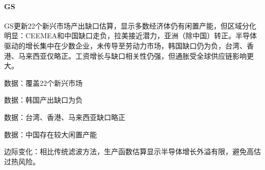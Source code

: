 \documentclass[11pt]{ctexart}
\begin{document}
\paragraph{GS} GS更新22个新兴市场产出缺口估算，显示多数经济体仍有闲置产能，但区域分化明显：CEEMEA和中国缺口走负，拉美接近潜力，亚洲（除中国）转正。半导体驱动的增长集中在少数企业，未传导至劳动力市场，韩国缺口仍为负，台湾、香港、马来西亚仅略正。工资增长与缺口相关性仍强，但通胀受全球供应链影响更大。
{\small\color{refgray}数据：覆盖22个新兴市场\par}
{\small\color{refgray}数据：韩国产出缺口为负\par}
{\small\color{refgray}数据：台湾、香港、马来西亚缺口略正\par}
{\small\color{refgray}数据：中国存在较大闲置产能\par}
{\small\color{refgray}边际变化：相比传统滤波方法，生产函数估算显示半导体增长外溢有限，避免高估过热风险。\par}
\end{document}
